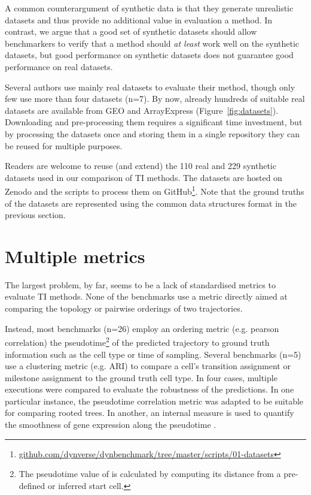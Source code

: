 A common counterargument of synthetic data is that they generate unrealistic datasets and thus provide no additional value in evaluation a method. In contrast, we argue that a good set of synthetic datasets should allow benchmarkers to verify that a method should \textit{at least} work well on the synthetic datasets, but good performance on synthetic datasets does not guarantee good performance on real datasets.

Several authors use mainly real datasets to evaluate their method, though only few use more than four datasets (n=7). 
By now, already hundreds of suitable real datasets are available from GEO and ArrayExpress (Figure~\ref{fig:datasets}). Downloading and pre-processing them requires a significant time investment, but by processing the datasets once and storing them in a single repository they can be reused for multiple purposes.

Readers are welcome to reuse (and extend) the 110 real and 229 synthetic datasets used in our comparison of TI methods. The datasets are hosted on Zenodo\cite{cannoodt_singlecellomicsdatasets_2018} and the scripts to process them on GitHub\footnote{\href{https://github.com/dynverse/dynbenchmark/tree/master/scripts/01-datasets}{github.com/dynverse/dynbenchmark/tree/master/scripts/01-datasets}}. Note that the ground truths of the datasets are represented using the common data structures format in the previous section.



\section{Multiple metrics}
The largest problem, by far, seems to be a lack of standardised metrics to evaluate TI methods. None of the benchmarks use a metric directly aimed at comparing the topology or pairwise orderings of two trajectories. 

Instead, most benchmarks (n=26) employ an ordering metric (e.g. pearson correlation) the pseudotime\footnote{The pseudotime value of is calculated by computing its distance from a pre-defined or inferred start cell.} of the predicted trajectory to ground truth information such as the cell type or time of sampling. Several benchmarks (n=5) use a clustering metric (e.g. ARI) to compare a cell's transition assignment or milestone assignment to the ground truth cell type. In four cases, multiple executions were compared to evaluate the robustness of the predictions.
In one particular instance, the pseudotime correlation metric was adapted to be suitable for comparing rooted trees\cite{street_slingshotcelllineage_2018}. In another, an internal measure is used to quantify the smoothness of gene expression along the pseudotime \cite{darocha_reconstructioncomplexsinglecell_2018}.

